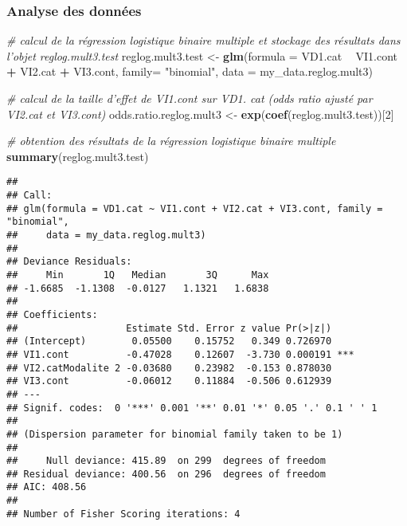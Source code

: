 \documentclass[
]{book}
\newenvironment{Shaded}{\begin{snugshade}}{\end{snugshade}}
\newcommand{\CommentTok}[1]{\textcolor[rgb]{0.56,0.35,0.01}{\textit{#1}}}
\newcommand{\DataTypeTok}[1]{\textcolor[rgb]{0.13,0.29,0.53}{#1}}
\newcommand{\DecValTok}[1]{\textcolor[rgb]{0.00,0.00,0.81}{#1}}
\newcommand{\KeywordTok}[1]{\textcolor[rgb]{0.13,0.29,0.53}{\textbf{#1}}}
\newcommand{\NormalTok}[1]{#1}
\newcommand{\OperatorTok}[1]{\textcolor[rgb]{0.81,0.36,0.00}{\textbf{#1}}}
\newcommand{\StringTok}[1]{\textcolor[rgb]{0.31,0.60,0.02}{#1}}
\begin{document}
\hypertarget{analyse-des-donnuxe9es-11}{%
\subsubsection{Analyse des données}\label{analyse-des-donnuxe9es-11}}

\begin{Shaded}
\begin{Highlighting}[]
\CommentTok{# calcul de la régression logistique binaire multiple et stockage des résultats dans l’objet reglog.mult3.test}
\NormalTok{reglog.mult3.test <-}\StringTok{ }\KeywordTok{glm}\NormalTok{(}\DataTypeTok{formula =}\NormalTok{ VD1.cat }\OperatorTok{~}\StringTok{ }\NormalTok{VI1.cont }\OperatorTok{+}\StringTok{ }\NormalTok{VI2.cat }\OperatorTok{+}\StringTok{ }\NormalTok{VI3.cont, }
                         \DataTypeTok{family=} \StringTok{"binomial"}\NormalTok{, }
                         \DataTypeTok{data =}\NormalTok{ my_data.reglog.mult3)}


\CommentTok{# calcul de la taille d'effet de VI1.cont sur VD1. cat (odds ratio ajusté par VI2.cat et VI3.cont)}
\NormalTok{odds.ratio.reglog.mult3 <-}\StringTok{ }\KeywordTok{exp}\NormalTok{(}\KeywordTok{coef}\NormalTok{(reglog.mult3.test))[}\DecValTok{2}\NormalTok{]}

\CommentTok{# obtention des résultats de la régression logistique binaire multiple}
\KeywordTok{summary}\NormalTok{(reglog.mult3.test)}
\end{Highlighting}
\end{Shaded}

\begin{verbatim}
## 
## Call:
## glm(formula = VD1.cat ~ VI1.cont + VI2.cat + VI3.cont, family = "binomial", 
##     data = my_data.reglog.mult3)
## 
## Deviance Residuals: 
##     Min       1Q   Median       3Q      Max  
## -1.6685  -1.1308  -0.0127   1.1321   1.6838  
## 
## Coefficients:
##                   Estimate Std. Error z value Pr(>|z|)    
## (Intercept)        0.05500    0.15752   0.349 0.726970    
## VI1.cont          -0.47028    0.12607  -3.730 0.000191 ***
## VI2.catModalite 2 -0.03680    0.23982  -0.153 0.878030    
## VI3.cont          -0.06012    0.11884  -0.506 0.612939    
## ---
## Signif. codes:  0 '***' 0.001 '**' 0.01 '*' 0.05 '.' 0.1 ' ' 1
## 
## (Dispersion parameter for binomial family taken to be 1)
## 
##     Null deviance: 415.89  on 299  degrees of freedom
## Residual deviance: 400.56  on 296  degrees of freedom
## AIC: 408.56
## 
## Number of Fisher Scoring iterations: 4
\end{verbatim}
\end{document}

